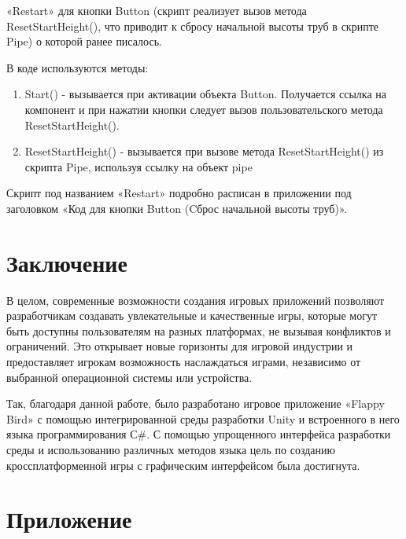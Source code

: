 \documentclass[14pt, oneside]{altsu-report}
\begin{document}
«Restart» для кнопки Button (скрипт реализует вызов метода ResetStartHeight(), что приводит к сбросу начальной высоты труб в скрипте Pipe) о которой ранее писалось. 

В коде используются методы:

\begin{enumerate}
\item Start() - вызывается при активации объекта Button. Получается ссылка на компонент и при нажатии кнопки следует вызов пользовательского метода ResetStartHeight().
\item ResetStartHeight() - вызывается при вызове метода ResetStartHeight() из скрипта Pipe, используя ссылку на объект pipe
\end{enumerate} 

Скрипт под названием «Restart» подробно расписан в приложении под заголовком «Код для кнопки Button (Cброс начальной высоты труб)».



\chapter*{Заключение}

В целом, современные возможности создания игровых приложений позволяют разработчикам создавать увлекательные и качественные игры, которые могут быть доступны пользователям на разных платформах, не вызывая конфликтов и ограничений. Это открывает новые горизонты для игровой индустрии и предоставляет игрокам возможность наслаждаться играми, независимо от выбранной операционной системы или устройства.

Так, благодаря данной работе, было разработано игровое приложение «Flappy Bird» с помощью интегрированной среды разработки Unity и встроенного в него языка программирования С\#. С помощью упрощенного интерфейса разработки среды и использованию различных методов языка цель по созданию кроссплатформенной игры с графическим интерфейсом была достигнута.

\newpage
{}
\printbibliography[title={Список использованной литературы}]

\appendix
\newpage
\chapter*{\raggedleft\label{appendix1}Приложение}
\end{document}
